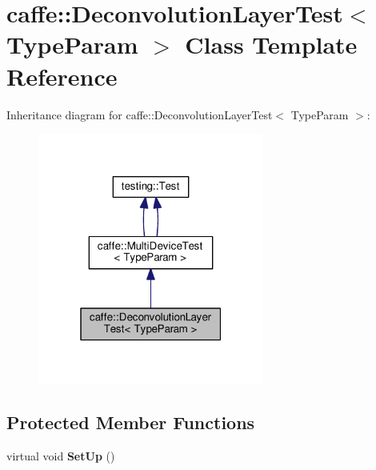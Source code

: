 \hypertarget{classcaffe_1_1_deconvolution_layer_test}{}\section{caffe\+:\+:Deconvolution\+Layer\+Test$<$ Type\+Param $>$ Class Template Reference}
\label{classcaffe_1_1_deconvolution_layer_test}


Inheritance diagram for caffe\+:\+:Deconvolution\+Layer\+Test$<$ Type\+Param $>$\+:
\nopagebreak
\begin{figure}[H]
\begin{center}
\leavevmode
\includegraphics[width=211pt]{classcaffe_1_1_deconvolution_layer_test__inherit__graph}
\end{center}
\end{figure}
\subsection*{Protected Member Functions}
\begin{DoxyCompactItemize}
\item 
\mbox{\label{classcaffe_1_1_deconvolution_layer_test_a8acb6571c98f85777f98537378b3ccd1}} 
virtual void {\bfseries Set\+Up} ()
\end{DoxyCompactItemize}
